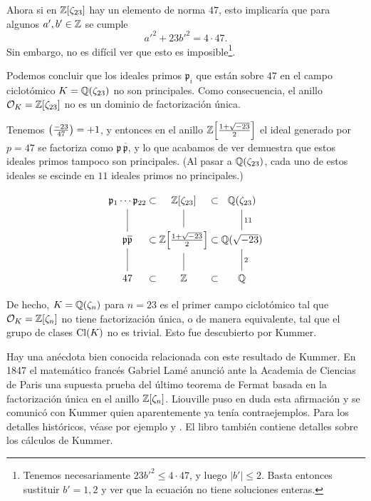 \begin{ejemplo}[Kummer]
  Ahora si en $\mathbb{Z} [\zeta_{23}]$ hay un elemento de norma $47$, esto implicaría
  que para algunos $a',b' \in \mathbb{Z}$ se cumple
  $$a'^2 + 23b'^2 = 4\cdot 47.$$
  Sin embargo, no es difícil ver que esto es imposible\footnote{Tenemos
    necesariamente $23 b'^2 \le 4\cdot 47$, y luego $|b'| \le 2$. Basta
    entonces sustituir $b' = 1,2$ y ver que la ecuación no tiene soluciones
    enteras.}.

  Podemos concluir que los ideales primos $\mathfrak{p}_i$ que están sobre $47$
  en el campo ciclotómico $K = \mathbb{Q} (\zeta_{23})$ no son principales. Como
  consecuencia, el anillo $\mathcal{O}_K = \mathbb{Z} [\zeta_{23}]$ no es un dominio de
  factorización única.

  Tenemos $\left(\frac{-23}{47}\right) = +1$, y entonces en el anillo
  $\mathbb{Z} \Bigl[\frac{1 + \sqrt{-23}}{2}\Bigr]$ el ideal generado por $p = 47$
  se factoriza como $\mathfrak{p}\,\overline{\mathfrak{p}}$, y lo que acabamos
  de ver demuestra que estos ideales primos tampoco son principales.
  (Al pasar a $\mathbb{Q} (\zeta_{23})$, cada uno de estos ideales se escinde en $11$
  ideales primos no principales.)

  \[ \begin{tikzcd}
    \mathfrak{p}_1 \cdots \mathfrak{p}_{22} \ar[-]{d} &[-3em] \subset &[-3em] \ZZ [\zeta_{23}]\ar[-]{d} &[-3em] \subset &[-3em] \QQ (\zeta_{23}) \ar[-]{d}{11} \\
    \mathfrak{p} \overline{\mathfrak{p}} \ar[-]{d} & \subset & \ZZ \Bigl[\frac{1 + \sqrt{-23}}{2}\Bigr]\ar[-]{d} & \subset & \QQ (\sqrt{-23}) \ar[-]{d}{2} \\
    47 & \subset & \ZZ & \subset & \QQ
    \end{tikzcd} \]
\end{ejemplo}

De hecho, $K = \mathbb{Q} (\zeta_n)$ para $n = 23$ es el primer campo ciclotómico
tal que $\mathcal{O}_K = \mathbb{Z} [\zeta_n]$ no tiene factorización única, o de manera
equivalente, tal que el grupo de clases $\operatorname{Cl} (K)$ no es trivial. Esto fue
descubierto por Kummer.

Hay una anécdota bien conocida relacionada con este resultado de Kummer.
En 1847 el matemático francés Gabriel Lamé anunció ante la Academia de Ciencias
de Paris una supuesta prueba del último teorema de Fermat basada en
la factorización única en el anillo $\mathbb{Z} [\zeta_n]$. Liouville puso en duda esta
afirmación y se comunicó con Kummer quien aparentemente ya tenía
contraejemplos. Para los detalles históricos, véase por ejemplo
\cite{Edwards-1975} y \cite{Edwards-1977}. El libro \cite{Edwards-1996}
también contiene detalles sobre los cálculos de Kummer.

